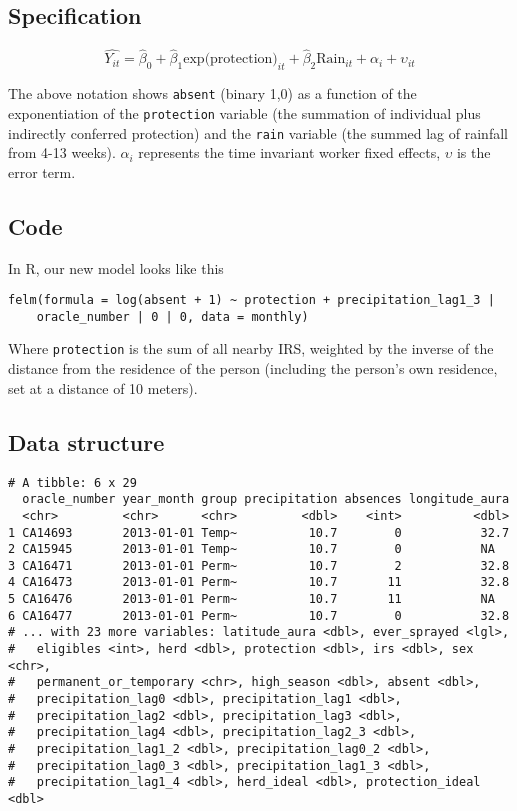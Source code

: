 \documentclass[]{article}
\begin{document}
\subsection{Specification}\label{specification}

\[
\hat{Y_{it}} = \hat{\beta}_{0} +  \hat{\beta}_{1}\text{exp(protection)}_{it}  + \hat{\beta}_{2}\text{Rain}_{it} +  \alpha_i + \upsilon_{it}
\]

The above notation shows \texttt{absent} (binary 1,0) as a function of
the exponentiation of the \texttt{protection} variable (the summation of
individual plus indirectly conferred protection) and the \texttt{rain}
variable (the summed lag of rainfall from 4-13 weeks). \(\alpha_i\)
represents the time invariant worker fixed effects, \(\upsilon\) is the
error term.

\subsection{Code}\label{code}

In R, our new model looks like this

\begin{verbatim}
felm(formula = log(absent + 1) ~ protection + precipitation_lag1_3 | 
    oracle_number | 0 | 0, data = monthly)
\end{verbatim}

Where \texttt{protection} is the sum of all nearby IRS, weighted by the
inverse of the distance from the residence of the person (including the
person's own residence, set at a distance of 10 meters).

\subsection{Data structure}\label{data-structure}

\begin{verbatim}
# A tibble: 6 x 29
  oracle_number year_month group precipitation absences longitude_aura
  <chr>         <chr>      <chr>         <dbl>    <int>          <dbl>
1 CA14693       2013-01-01 Temp~          10.7        0           32.7
2 CA15945       2013-01-01 Temp~          10.7        0           NA  
3 CA16471       2013-01-01 Perm~          10.7        2           32.8
4 CA16473       2013-01-01 Perm~          10.7       11           32.8
5 CA16476       2013-01-01 Perm~          10.7       11           NA  
6 CA16477       2013-01-01 Perm~          10.7        0           32.8
# ... with 23 more variables: latitude_aura <dbl>, ever_sprayed <lgl>,
#   eligibles <int>, herd <dbl>, protection <dbl>, irs <dbl>, sex <chr>,
#   permanent_or_temporary <chr>, high_season <dbl>, absent <dbl>,
#   precipitation_lag0 <dbl>, precipitation_lag1 <dbl>,
#   precipitation_lag2 <dbl>, precipitation_lag3 <dbl>,
#   precipitation_lag4 <dbl>, precipitation_lag2_3 <dbl>,
#   precipitation_lag1_2 <dbl>, precipitation_lag0_2 <dbl>,
#   precipitation_lag0_3 <dbl>, precipitation_lag1_3 <dbl>,
#   precipitation_lag1_4 <dbl>, herd_ideal <dbl>, protection_ideal <dbl>
\end{verbatim}
\end{document}
